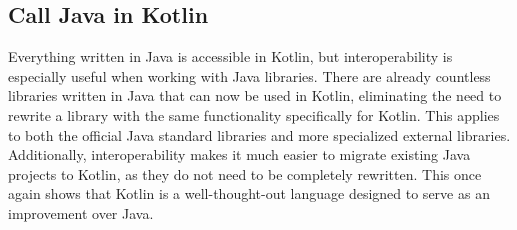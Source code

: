 \documentclass[a4paper, 11pt]{article}
\begin{document}
\subsection{Call Java in Kotlin}
  Everything written in Java is accessible in Kotlin, but interoperability is especially useful when working with Java libraries. There are already countless libraries written in Java that can now be used in Kotlin, eliminating the need to rewrite a library with the same functionality specifically for Kotlin. This applies to both the official Java standard libraries and more specialized external libraries. Additionally, interoperability makes it much easier to migrate existing Java projects to Kotlin, as they do not need to be completely rewritten. This once again shows that Kotlin is a well-thought-out language designed to serve as an improvement over Java.
\end{document}
